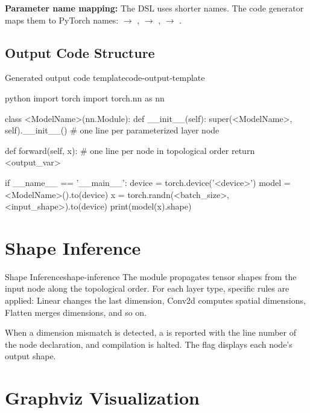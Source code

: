 \documentclass{nngraph-en}
\begin{document}
\begin{notebox}
\textbf{Parameter name mapping:} The DSL uses shorter names. The
code generator maps them to PyTorch names:
 $\to$ ,
 $\to$ ,
 $\to$ .
\end{notebox}

\subsection{Output Code Structure}

\begin{codebox}{Generated output code template}{code-output-template}
\begin{amzcode}{python}
import torch
import torch.nn as nn


class <ModelName>(nn.Module):
    def __init__(self):
        super(<ModelName>, self).__init__()
        # one line per parameterized layer node

    def forward(self, x):
        # one line per node in topological order
        return <output_var>


if __name__ == '__main__':
    device = torch.device('<device>')
    model  = <ModelName>().to(device)
    x      = torch.randn(<batch_size>, <input_shape>).to(device)
    print(model(x).shape)
\end{amzcode}
\end{codebox}

\section{Shape Inference}

\begin{dfnbox}{Shape Inference}{shape-inference}
The  module propagates tensor shapes from
the input node along the topological order. For each layer type,
specific rules are applied: Linear changes the last dimension,
Conv2d computes spatial dimensions, Flatten merges dimensions,
and so on.
\end{dfnbox}

When a dimension mismatch is detected, a  is
reported with the line number of the node declaration, and
compilation is halted. The  flag displays
each node's output shape.

\section{Graphviz Visualization}
\end{document}
